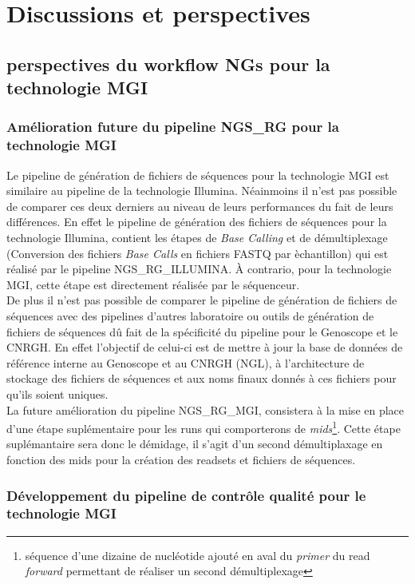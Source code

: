 \section{Discussions et perspectives}
\subsection{perspectives du workflow NGs pour la technologie MGI}

\subsubsection{Amélioration future du pipeline NGS\_RG pour la technologie MGI}
Le pipeline de génération de fichiers de séquences pour la technologie MGI est similaire au pipeline de la technologie Illumina. Néainmoins il n'est pas possible de comparer ces deux derniers au niveau de leurs performances du fait de leurs différences. En effet le pipeline de génération des fichiers de séquences pour la technologie Illumina, contient les étapes de \emph{Base Calling} et de démultiplexage (Conversion des fichiers \emph{Base Calls} en fichiers FASTQ par èchantillon) qui est réalisé par le pipeline NGS\_RG\_ILLUMINA. À contrario, pour la technologie MGI, cette étape est directement réalisée par le séquenceur.\\
De plus il n'est pas possible de comparer le pipeline de génération de fichiers de séquences avec des pipelines d'autres laboratoire ou outils de génération de fichiers de séquences dû fait de la spécificité du pipeline pour le Genoscope et le CNRGH. En effet l'objectif de celui-ci est de mettre à jour la base de données de référence interne au Genoscope et au CNRGH (NGL), à l'architecture de stockage des fichiers de séquences et aux noms finaux donnés à ces fichiers pour qu'ils soient uniques.\\

La future amélioration du pipeline NGS\_RG\_MGI, consistera à la mise en place d'une étape suplémentaire pour les runs qui comporterons de \emph{mids}\footnote{séquence d'une dizaine de nucléotide ajouté en aval du \emph{primer} du read \emph{forward} permettant de réaliser un second démultiplexage}. Cette étape suplémantaire sera donc le démidage, il s'agit d'un second démultiplaxage en fonction des mids pour la création des readsets et fichiers de séquences.


\subsubsection{Développement du pipeline de contrôle qualité pour le technologie MGI}
